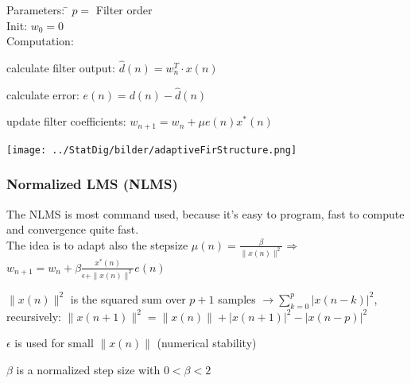 \begin{minipage}{9cm}
  \begin{tabbing}
  	Parameters:  \= $p= $ Filter order\\
  	Init:		\> $w_0= 0$\\
  	Computation:
  \end{tabbing}	
      \begin{aufzaehlung}
          \item calculate filter output: $\hat{d}(n) = w_n^T\cdot x(n)$ 
          \item calculate error: $e(n) = d(n) - \hat{d}(n)$
          \item update filter coefficients: $w_{n+1}=w_n+\mu e(n)x^*(n)$  
      \end{aufzaehlung}\vspace{0.05cm}

\end{minipage} 
\begin{minipage}{10cm}
  \texttt{[image: ../StatDig/bilder/adaptiveFirStructure.png]}
\end{minipage}

\subsubsection{Normalized LMS (NLMS) }
The NLMS is most command used, because it's easy to program, fast to compute and convergence quite fast.\\
The idea is to adapt also the stepsize $\mu(n)=\frac{\beta}{\|x(n)\|^2} \Rightarrow $
$\boxed{w_{n+1}=w_n +\beta \frac{x^*(n)}{\epsilon+\|x(n)\|^2}e(n)}$\\
\begin{liste}
	\item $\|x(n)\|^2$ is the squared sum over $p+1$ samples $\to \sum\limits_{k=0}^{p} | x(n-k) |^2 $, recursively: $\|x(n+1)\|^2 =  \|x(n)\| + |x(n+1)|^2 -|x(n-p)|^2$
 	\item $\epsilon$ is used for small $\|x(n)\|$ (numerical stability)
	\item $\beta$ is a normalized step size with $0 < \beta < 2$
\end{liste}



